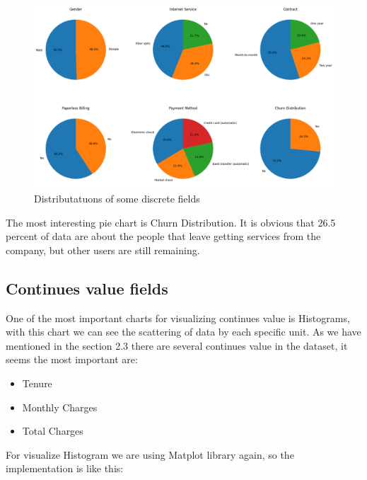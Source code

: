 \documentclass[12pt]{article}
\begin{document}
\vspace{1cm}
\begin{figure}[htbp]
  \centering
  \includegraphics[width=\textwidth]{assets/distributatuons.png}
  \caption{Distributatuons of some discrete fields}
\end{figure}
\vspace{\baselineskip}
\newline
The most interesting pie chart is Churn Distribution. It is obvious that 26.5 percent of data are about the people that leave getting services from the company, but other users are still remaining.


\newpage
\subsection{Continues value fields}
One of the most important charts for visualizing continues value is Histograms, with this chart we can see the scattering of data by each specific unit.
As we have mentioned in the section 2.3 there are several continues value in the dataset, it seems the most important are:
\begin{itemize}
  \item Tenure
  \item Monthly Charges
  \item Total Charges
\end{itemize}
\vspace{1cm}
For visualize Histogram we are using Matplot library again, so the implementation is like this:

\vspace{1cm}
\end{document}
